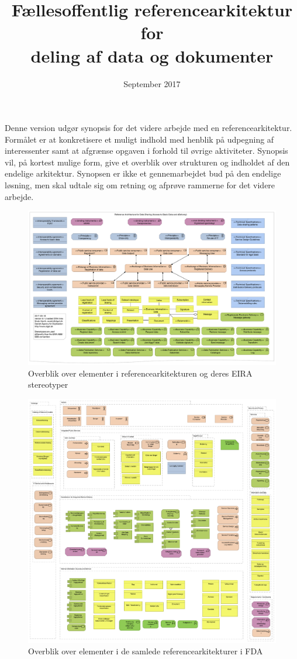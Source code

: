 \documentclass[12pt]{article}
\title{Fællesoffentlig referencearkitektur for \\ deling af data og dokumenter}
\author{}
\date{September 2017}
\begin{document}
\maketitle

Denne version udgør synopsis for det videre arbejde med en referencearkitektur.
Formålet er at konkretisere et muligt indhold med henblik på udpegning af interessenter samt at afgrænse opgaven i forhold til øvrige aktiviteter.
Synopsis vil, på kortest mulige form, give et overblik over strukturen og indholdet af den endelige arkitektur. Synopsen er ikke et gennemarbejdet bud på den endelige løsning, men skal udtale sig om retning og afprøve rammerne for det videre arbejde.

\tableofcontents
\newpage




\newpage
\thispagestyle{empty}
\begin{figure}
\centering
\includegraphics[angle=90, height=\textheight]{../overview.pdf}
\caption{Overblik over elementer i referencearkitekturen og deres EIRA stereotyper}
\end{figure}

\newpage
\thispagestyle{empty}
\begin{figure}
\centering
\includegraphics[angle=0, width=\textwidth]{../eco.pdf}
\caption{Overblik over elementer i de samlede referencearkitekturer i FDA}
\end{figure}
\end{document}
